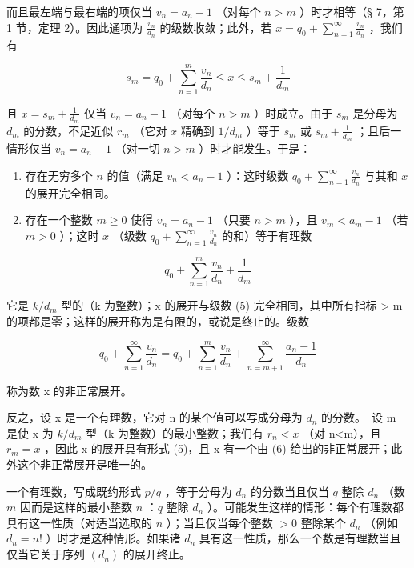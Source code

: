 而且最左端与最右端的项仅当 \(v_{n} = a_{n} - 1\) （对每个 \(n > m\) ）时才相等（§ 7，第 1 节，定理 2）。因此通项为 \(\frac{v_n}{d_n}\) 的级数收敛；此外，若 \(x = q_0 + \sum_{n=1}^{\infty} \frac{v_n}{d_n}\) ，我们有

\[
s _ {m} = q _ {0} + \sum_ {n = 1} ^ {m} \frac {v _ {n}}{d _ {n}} \leqslant x \leqslant s _ {m} + \frac {1}{d _ {m}}
\]

且 \(x = s_m + \frac{1}{d_m}\) 仅当 \(v_n = a_n - 1\) （对每个 \(n > m\) ）时成立。由于 \(s_m\) 是分母为 \(d_m\) 的分数，不足近似 \(r_m\) （它对 \(x\) 精确到 \(1/d_m\) ）等于 \(s_m\) 或 \(s_m + \frac{1}{d_m}\) ；且后一情形仅当 \(v_{n} = a_{n} - 1\) （对一切 \(n > m\) ）时才能发生。于是：

\begin{enumerate}
\def\labelenumi{(\roman{enumi})}
\item
  存在无穷多个 \(n\) 的值（满足 \(v_{n} < a_{n} - 1\) ）：这时级数 \(q_{0} + \sum_{n=1}^{\infty} \frac{v_{n}}{d_{n}}\) 与其和 \(x\) 的展开完全相同。
\item
  存在一个整数 \(m \geqslant 0\) 使得 \(v_{n} = a_{n} - 1\) （只要 \(n > m\) ），且 \(v_{m} < a_{m} - 1\) （若 \(m > 0\) ）；这时 \(x\) （级数 \(q_{0} + \sum_{n=1}^{\infty} \frac{v_{n}}{d_{n}}\) 的和）等于有理数
\end{enumerate}

\[
q _ {0} + \sum_ {n = 1} ^ {m} \frac {v _ {n}}{d _ {n}} + \frac {1}{d _ {m}}\tag{5}
\]

它是 \(k/d_{m}\) 型的（k 为整数）；x 的展开与级数 (5) 完全相同，其中所有指标 \textgreater{} m 的项都是零；这样的展开称为是有限的，或说是终止的。级数

\[
q _ {0} + \sum_ {n = 1} ^ {\infty} \frac {v _ {n}}{d _ {n}} = q _ {0} + \sum_ {n = 1} ^ {m} \frac {v _ {n}}{d _ {n}} + \sum_ {n = m + 1} ^ {\infty} \frac {a _ {n} - 1}{d _ {n}}\tag{6}
\]

称为数 x 的非正常展开。

反之，设 x 是一个有理数，它对 n 的某个值可以写成分母为 \(d_{n}\) 的分数。~设 m 是使 x 为 \(k/d_{m}\) 型（k 为整数）的最小整数；我们有 \(r_{n}<x\) （对 n\textless m），且 \(r_{m}=x\) ，因此 x 的展开具有形式 (5)，且 x 有一个由 (6) 给出的非正常展开；此外这个非正常展开是唯一的。

一个有理数，写成既约形式 \(p / q\) ，等于分母为 \(d_n\) 的分数当且仅当 \(q\) 整除 \(d_n\) （数 \(m\) 因而是这样的最小整数 \(n\) ：\(q\) 整除 \(d_n\) ）。可能发生这样的情形：每个有理数都具有这一性质（对适当选取的 \(n\) ）；当且仅当每个整数 \(> 0\) 整除某个 \(d_n\) （例如 \(d_n = n!\) ）时才是这种情形。如果诸 \(d_n\) 具有这一性质，那么一个数是有理数当且仅当它关于序列 \((d_n)\) 的展开终止。

